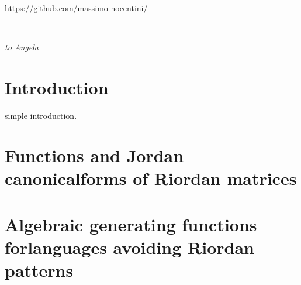 \documentclass[a4paper,symmetric]{tufte-book}
\newcommand{\monthyear}{%
  \ifcase\month\or January\or February\or March\or April\or May\or June\or
  July\or August\or September\or October\or November\or
  December\fi\space\number\year
}
\begin{document}
\fi

\cleardoublepage
\begin{fullwidth}
~\vfill
\thispagestyle{empty}
\setlength{\parindent}{0pt}
\setlength{\parskip}{\baselineskip}

\par{\url{https://github.com/massimo-nocentini/}}
\end{fullwidth}

\tableofcontents


\listoftables

\cleardoublepage
~\vfill
\begin{doublespace}
\noindent\fontsize{18}{22}\selectfont\itshape
\nohyphenation
to \mbox{Angela}
\end{doublespace}
\vfill
\vfill


\cleardoublepage
\chapter*{Introduction}

simple introduction.




\chapter{Functions and Jordan canonical\newline forms of Riordan matrices}
\label{ch:Riordan-matrices-function}



\chapter{Algebraic generating functions for\newline languages avoiding Riordan patterns}
\label{ch:algebraic-gfs-languages-avoiding-Riordan-patterns}


\end{document}
